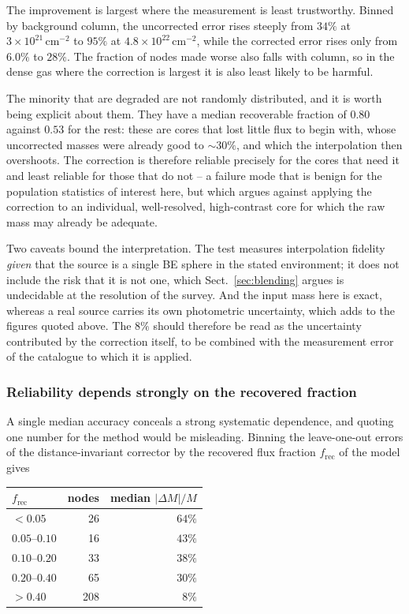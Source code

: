 \documentclass[11pt,a4paper]{article}
\begin{document}
The improvement is largest where the measurement is least trustworthy. Binned
by background column, the uncorrected error rises steeply from $34\%$ at
$3\times10^{21}\,\mathrm{cm^{-2}}$ to $95\%$ at
$4.8\times10^{22}\,\mathrm{cm^{-2}}$, while the corrected error rises only from
$6.0\%$ to $28\%$. The fraction of nodes made worse also falls with column, so
in the dense gas where the correction is largest it is also least likely to be
harmful.

The minority that are degraded are not randomly distributed, and it is worth
being explicit about them. They have a median recoverable fraction of $0.80$
against $0.53$ for the rest: these are cores that lost little flux to begin
with, whose uncorrected masses were already good to $\sim$$30\%$, and which the
interpolation then overshoots. The correction is therefore reliable precisely
for the cores that need it and least reliable for those that do not -- a
failure mode that is benign for the population statistics of interest here,
but which argues against applying the correction to an individual,
well-resolved, high-contrast core for which the raw mass may already be
adequate.

Two caveats bound the interpretation. The test measures interpolation fidelity
\emph{given} that the source is a single BE sphere in the stated environment;
it does not include the risk that it is not one, which
Sect.~\ref{sec:blending} argues is undecidable at the resolution of the survey.
And the input mass here is exact, whereas a real source carries its own
photometric uncertainty, which adds to the figures quoted above. The $8\%$
should therefore be read as the uncertainty contributed by the correction
itself, to be combined with the measurement error of the catalogue to which it
is applied.

\subsubsection*{Reliability depends strongly on the recovered fraction}
\label{sec:reliability}

A single median accuracy conceals a strong systematic dependence, and quoting
one number for the method would be misleading. Binning the leave-one-out
errors of the distance-invariant corrector by the recovered flux fraction
$f_{\mathrm{rec}}$ of the model gives

\begin{center}
\begin{tabular}{lrr}
\hline
$f_{\mathrm{rec}}$ & nodes & median $|\Delta M|/M$ \\
\hline
$<0.05$        &  26 & $64\%$ \\
$0.05$--$0.10$ &  16 & $43\%$ \\
$0.10$--$0.20$ &  33 & $38\%$ \\
$0.20$--$0.40$ &  65 & $30\%$ \\
$>0.40$        & 208 & $\phantom{0}8\%$ \\
\hline
\end{tabular}
\end{center}
\end{document}
